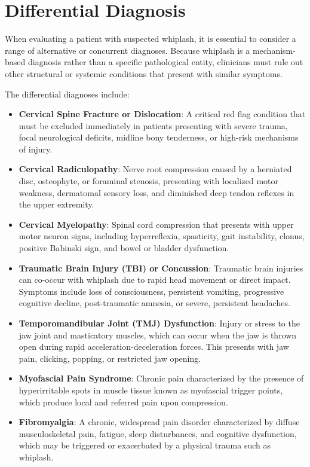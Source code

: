 \section*{Differential Diagnosis}
When evaluating a patient with suspected whiplash, it is essential to consider a range of alternative or concurrent diagnoses. Because whiplash is a mechanism-based diagnosis rather than a specific pathological entity, clinicians must rule out other structural or systemic conditions that present with similar symptoms.

The differential diagnoses include:
\begin{itemize}
    \item \textbf{Cervical Spine Fracture or Dislocation}: A critical red flag condition that must be excluded immediately in patients presenting with severe trauma, focal neurological deficits, midline bony tenderness, or high-risk mechanisms of injury.
    \item \textbf{Cervical Radiculopathy}: Nerve root compression caused by a herniated disc, osteophyte, or foraminal stenosis, presenting with localized motor weakness, dermatomal sensory loss, and diminished deep tendon reflexes in the upper extremity.
    \item \textbf{Cervical Myelopathy}: Spinal cord compression that presents with upper motor neuron signs, including hyperreflexia, spasticity, gait instability, clonus, positive Babinski sign, and bowel or bladder dysfunction.
    \item \textbf{Traumatic Brain Injury (TBI) or Concussion}: Traumatic brain injuries can co-occur with whiplash due to rapid head movement or direct impact. Symptoms include loss of consciousness, persistent vomiting, progressive cognitive decline, post-traumatic amnesia, or severe, persistent headaches.
    \item \textbf{Temporomandibular Joint (TMJ) Dysfunction}: Injury or stress to the jaw joint and masticatory muscles, which can occur when the jaw is thrown open during rapid acceleration-deceleration forces. This presents with jaw pain, clicking, popping, or restricted jaw opening.
    \item \textbf{Myofascial Pain Syndrome}: Chronic pain characterized by the presence of hyperirritable spots in muscle tissue known as myofascial trigger points, which produce local and referred pain upon compression.
    \item \textbf{Fibromyalgia}: A chronic, widespread pain disorder characterized by diffuse musculoskeletal pain, fatigue, sleep disturbances, and cognitive dysfunction, which may be triggered or exacerbated by a physical trauma such as whiplash.
\end{itemize}

